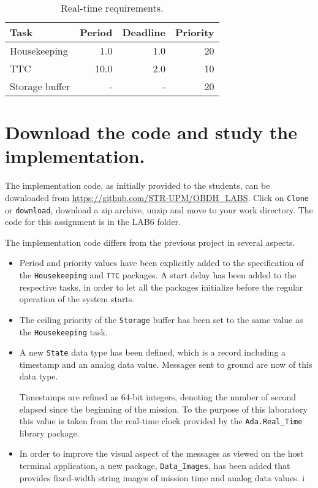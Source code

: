\begin{table}[htb]
\begin{center}
\begin{tabular}{|l|r|r|r|} \hline
Task & Period & Deadline & Priority\\ \hline
Housekeeping & 1.0 & 1.0 & 20 \\
TTC & 10.0 & 2.0 & 10 \\
Storage buffer & - & - & 20 \\ \hline
\end{tabular}
\caption{Real-time requirements.}
\label{tb:requirements}
\end{center}
\end{table}

\section{Download the code and study the implementation.}

The implementation code, as initially provided to the students, can be downloaded from \url{https://github.com/STR-UPM/OBDH\_LABS}. Click on {\tt Clone} or {\tt download}, download a zip archive, unzip and move to your work directory. The code for this assignment is in the LAB6 folder.

The implementation code differs from the previous project in several aspects.
\begin{itemize}
\item Period and priority values have been explicitly added to the specification of the {\tt Housekeeping} and {\tt TTC} packages. A start delay has been added to the respective tasks, in order to let all the packages initialize before the regular operation of the system starts.
\item The ceiling priority of the {\tt Storage} buffer has been set to the same value as the {\tt Housekeeping} task.
\item A new {\tt State} data type has been defined, which is a record including a timestamp and an analog data value. Messages sent to ground are now of this data type.

Timestamps are refined as 64-bit integers, denoting the number of second elapsed since the beginning of the mission. To the purpose of this laboratory this value is taken from the real-time clock provided by the {\tt Ada.Real\_Time} library package.
\item In order to improve the visual aspect of the messages as viewed on the host terminal application, a new package, {\tt Data\_Images}, has been added that provides fixed-width string images of mission time and analog data values.
i\end{itemize}

